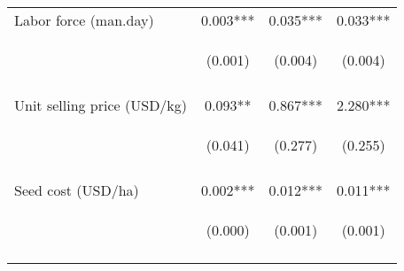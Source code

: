 \begin{center}
\begin{tabular}{lccc}
Labor force (man.day) & 0.003*** & 0.035*** & 0.033*** \\
 & \begin{footnotesize}(0.001)\end{footnotesize} & \begin{footnotesize}(0.004)\end{footnotesize} & \begin{footnotesize}(0.004)\end{footnotesize} \\
\vspace{4pt} & \begin{footnotesize}[0.000]\end{footnotesize} & \begin{footnotesize}[0.000]\end{footnotesize} & \begin{footnotesize}[0.000]\end{footnotesize} \\
Unit selling price (USD/kg) & 0.093** & 0.867*** & 2.280*** \\
 & \begin{footnotesize}(0.041)\end{footnotesize} & \begin{footnotesize}(0.277)\end{footnotesize} & \begin{footnotesize}(0.255)\end{footnotesize} \\
\vspace{4pt} & \begin{footnotesize}[0.024]\end{footnotesize} & \begin{footnotesize}[0.002]\end{footnotesize} & \begin{footnotesize}[0.000]\end{footnotesize} \\
Seed cost (USD/ha) & 0.002*** & 0.012*** & 0.011*** \\
 & \begin{footnotesize}(0.000)\end{footnotesize} & \begin{footnotesize}(0.001)\end{footnotesize} & \begin{footnotesize}(0.001)\end{footnotesize} \\
\vspace{4pt} & \begin{footnotesize}[0.000]\end{footnotesize} & \begin{footnotesize}[0.000]\end{footnotesize} & \begin{footnotesize}[0.000]\end{footnotesize} \\

\end{tabular}
\end{center}
